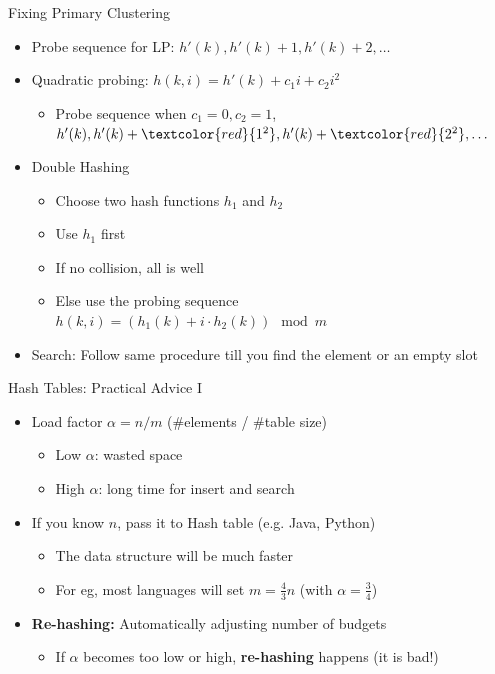 \documentclass{beamer}
\begin{document}
\begin{frame}{Fixing Primary Clustering}
    \begin{itemize}
        \item Probe sequence for LP: $h'(k), h'(k)+1, h'(k)+2, \ldots$
        \item Quadratic probing:  $h(k,i) = h'(k) + c_1 i + c_2 i^2$
            \begin{itemize}
                \item Probe sequence when $c_1=0, c_2=1$,\\ 
                    \qquad $h'(k), h'(k)+\textcolor{red}{1^2}, h'(k)+\textcolor{red}{2^2}, \ldots$
            \end{itemize}
        \item Double Hashing
            \begin{itemize}
                \item Choose two hash functions $h_1$ and $h_2$
                \item Use $h_1$ first
                \item If no collision, all is well
                \item Else use the probing sequence \\ \qquad $h(k,i) = ( h_1(k) + i \cdot h_2(k)) \mod m$
            \end{itemize}
        \item Search: Follow same procedure till you find the element or an empty slot 
    \end{itemize}
\end{frame}

\begin{frame}{Hash Tables: Practical Advice I}
    \begin{itemize}
        \item Load factor $\alpha = n/m$ (\#elements / \#table size)
        \begin{itemize}
            \item Low $\alpha$: wasted space 
            \item High $\alpha$: long time for insert and search
        \end{itemize}
        \item If you know $n$, pass it to Hash table (e.g. Java, Python)
        \begin{itemize}
            \item The data structure will be much faster
            \item For eg, most languages will set $m = \frac{4}{3} n$ (with $\alpha = \frac{3}{4}$)
        \end{itemize}
        \item {\bf Re-hashing:} Automatically adjusting number of budgets
        \begin{itemize}
            \item If $\alpha$ becomes too low or high, {\bf re-hashing} happens (it is bad!)
        \end{itemize}
    \end{itemize}
\end{frame}
\end{document}

